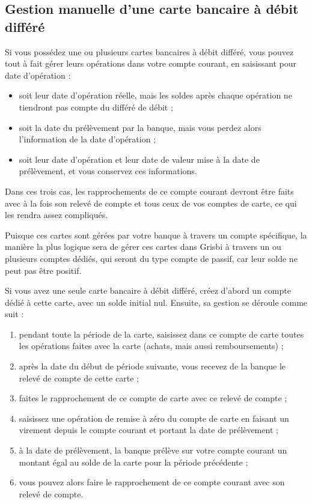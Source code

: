 \subsection{Gestion manuelle d'une carte bancaire à débit différé\label{bankcard-deferredCard-manage}}

Si vous possédez une ou plusieurs cartes bancaires à débit différé, vous pouvez tout à fait gérer leurs opérations dans votre compte courant, en saisissant pour date d'opération :
\begin{itemize}
	 \item soit leur date d'opération réelle, mais les soldes après chaque opération ne tiendront pas compte du différé de débit ;
	 \item soit la date du prélèvement par la banque, mais vous perdez alors l'information de la date d'opération ;
 	 \item soit leur date d'opération et leur date de valeur mise à la date de prélèvement, et vous conservez ces informations.
\end{itemize}

Dans ces trois cas, les rapprochements de ce compte courant devront être faits avec à la fois son relevé de compte et tous ceux de vos comptes de carte, ce qui les rendra assez compliqués.

Puisque ces cartes sont gérées par votre banque à travers un compte spécifique, la manière la plus logique sera de gérer ces cartes dans Grisbi à travers un ou plusieurs comptes dédiés, qui seront du type compte de passif, car leur solde ne peut pas être positif.

Si vous avez une seule carte bancaire à débit différé, créez d'abord un compte dédié à cette carte, avec un solde initial nul. Ensuite, sa gestion se déroule comme suit :

\begin{enumerate}
	\item pendant toute la période de la carte, saisissez dans ce compte de carte toutes les opérations faites avec la carte (achats, mais aussi remboursements)  ;
	\item après la date du début de période suivante, vous recevez de la banque le relevé de compte de cette carte ;
	\item faites le rapprochement de ce compte de carte avec ce relevé de compte ;
	\item saisissez une opération de remise à zéro du compte de carte en faisant un virement depuis le compte courant et portant la date de prélèvement ;
	\item à la date de prélèvement, la banque prélève sur votre compte courant un montant égal au solde de la carte pour la période précédente ;
	\item vous pouvez alors faire le rapprochement de ce compte courant avec son relevé de compte. 
\end{enumerate}

